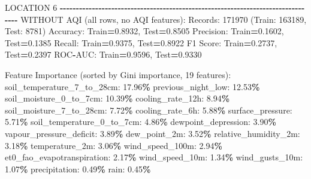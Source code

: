 \documentclass[
  letterpaper,
  DIV=11,
  numbers=noendperiod]{scrartcl}
\newenvironment{Shaded}{\begin{snugshade}}{\end{snugshade}}
\newcommand{\BuiltInTok}[1]{#1}
\newcommand{\DecValTok}[1]{\textcolor[rgb]{0.00,0.00,0.81}{#1}}
\newcommand{\FloatTok}[1]{\textcolor[rgb]{0.00,0.00,0.81}{#1}}
\newcommand{\NormalTok}[1]{#1}
\newcommand{\OperatorTok}[1]{\textcolor[rgb]{0.81,0.36,0.00}{\textbf{#1}}}
\begin{document}
\begin{Shaded}
\begin{Highlighting}[]
\NormalTok{LOCATION }\DecValTok{6}
\OperatorTok{{-}{-}{-}{-}{-}{-}{-}{-}{-}{-}{-}{-}{-}{-}{-}{-}{-}{-}{-}{-}{-}{-}{-}{-}{-}{-}{-}{-}{-}{-}{-}{-}{-}{-}{-}{-}{-}{-}{-}{-}{-}{-}{-}{-}{-}{-}{-}{-}{-}{-}{-}{-}{-}{-}{-}{-}{-}{-}{-}{-}{-}{-}{-}{-}{-}{-}{-}{-}{-}{-}{-}{-}{-}{-}{-}{-}{-}{-}{-}{-}}
\NormalTok{WITHOUT AQI (}\BuiltInTok{all}\NormalTok{ rows, no AQI features):}
\NormalTok{  Records: }\DecValTok{171970}\NormalTok{ (Train: }\DecValTok{163189}\NormalTok{, Test: }\DecValTok{8781}\NormalTok{)}
\NormalTok{  Accuracy: Train}\OperatorTok{=}\FloatTok{0.8932}\NormalTok{, Test}\OperatorTok{=}\FloatTok{0.8505}
\NormalTok{  Precision: Train}\OperatorTok{=}\FloatTok{0.1602}\NormalTok{, Test}\OperatorTok{=}\FloatTok{0.1385}
\NormalTok{  Recall: Train}\OperatorTok{=}\FloatTok{0.9375}\NormalTok{, Test}\OperatorTok{=}\FloatTok{0.8922}
\NormalTok{  F1 Score: Train}\OperatorTok{=}\FloatTok{0.2737}\NormalTok{, Test}\OperatorTok{=}\FloatTok{0.2397}
\NormalTok{  ROC}\OperatorTok{{-}}\NormalTok{AUC: Train}\OperatorTok{=}\FloatTok{0.9596}\NormalTok{, Test}\OperatorTok{=}\FloatTok{0.9330}

\NormalTok{  Feature Importance (}\BuiltInTok{sorted}\NormalTok{ by Gini importance, }\DecValTok{19}\NormalTok{ features):}
\NormalTok{    soil\_temperature\_7\_to\_28cm: }\FloatTok{17.96}\OperatorTok{\%}
\NormalTok{    previous\_night\_low: }\FloatTok{12.53}\OperatorTok{\%}
\NormalTok{    soil\_moisture\_0\_to\_7cm: }\FloatTok{10.39}\OperatorTok{\%}
\NormalTok{    cooling\_rate\_12h: }\FloatTok{8.94}\OperatorTok{\%}
\NormalTok{    soil\_moisture\_7\_to\_28cm: }\FloatTok{7.72}\OperatorTok{\%}
\NormalTok{    cooling\_rate\_6h: }\FloatTok{5.88}\OperatorTok{\%}
\NormalTok{    surface\_pressure: }\FloatTok{5.71}\OperatorTok{\%}
\NormalTok{    soil\_temperature\_0\_to\_7cm: }\FloatTok{4.86}\OperatorTok{\%}
\NormalTok{    dewpoint\_depression: }\FloatTok{3.90}\OperatorTok{\%}
\NormalTok{    vapour\_pressure\_deficit: }\FloatTok{3.89}\OperatorTok{\%}
\NormalTok{    dew\_point\_2m: }\FloatTok{3.52}\OperatorTok{\%}
\NormalTok{    relative\_humidity\_2m: }\FloatTok{3.18}\OperatorTok{\%}
\NormalTok{    temperature\_2m: }\FloatTok{3.06}\OperatorTok{\%}
\NormalTok{    wind\_speed\_100m: }\FloatTok{2.94}\OperatorTok{\%}
\NormalTok{    et0\_fao\_evapotranspiration: }\FloatTok{2.17}\OperatorTok{\%}
\NormalTok{    wind\_speed\_10m: }\FloatTok{1.34}\OperatorTok{\%}
\NormalTok{    wind\_gusts\_10m: }\FloatTok{1.07}\OperatorTok{\%}
\NormalTok{    precipitation: }\FloatTok{0.49}\OperatorTok{\%}
\NormalTok{    rain: }\FloatTok{0.45}\OperatorTok{\%}


\end{Highlighting}
\end{Shaded}
\end{document}
